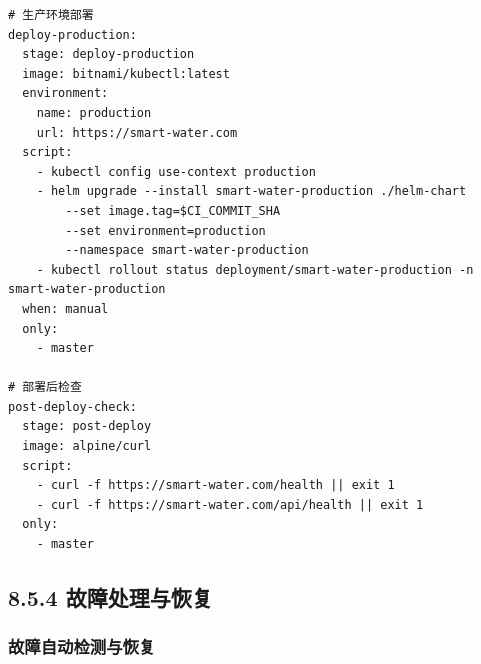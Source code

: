 \begin{lstlisting}
# 生产环境部署
deploy-production:
  stage: deploy-production
  image: bitnami/kubectl:latest
  environment:
    name: production
    url: https://smart-water.com
  script:
    - kubectl config use-context production
    - helm upgrade --install smart-water-production ./helm-chart 
        --set image.tag=$CI_COMMIT_SHA
        --set environment=production
        --namespace smart-water-production
    - kubectl rollout status deployment/smart-water-production -n smart-water-production
  when: manual
  only:
    - master

# 部署后检查
post-deploy-check:
  stage: post-deploy
  image: alpine/curl
  script:
    - curl -f https://smart-water.com/health || exit 1
    - curl -f https://smart-water.com/api/health || exit 1
  only:
    - master
\end{lstlisting}

\subsection{8.5.4
故障处理与恢复}\label{ux6545ux969cux5904ux7406ux4e0eux6062ux590d}

\subsubsection{故障自动检测与恢复}\label{ux6545ux969cux81eaux52a8ux68c0ux6d4bux4e0eux6062ux590d}

